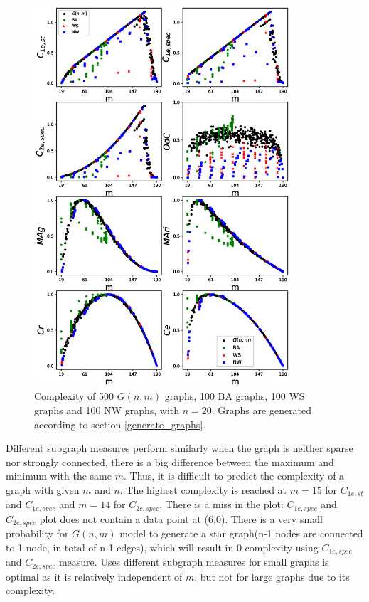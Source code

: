 \documentclass[12pt]{article}
\begin{document}
\noindent
\newpage
\begin{figure}[p!]
    \centering
    \vspace*{-2in}
    \includegraphics[width = 0.85\textwidth]{complexities_sp.eps}
    \vspace*{-0.8in}
    \caption{Complexity of 500 $G(n,m)$ graphs, 100 BA graphs, 100 WS graphs and 100 NW graphs, with $n=20$. Graphs are generated according to section \ref{generate_graphs}.}
    \label{fig:graph_models}
\end{figure}

Different subgraph measures perform similarly when the graph is neither sparse nor strongly connected, there is a big difference between the maximum and minimum with the same $m$. Thus, it is difficult to predict the complexity of a graph with given $m$ and $n$. The highest complexity is reached at $m=15$ for $C_{1e,st}$ and $C_{1e,spec}$ and $m=14$ for $C_{2e,spec}$. There is a miss in the plot: $C_{1e,spec}$ and $C_{2e,spec}$ plot does not contain a data point at (6,0). There is a very small probability for $G(n,m)$ model to generate a star graph(n-1 nodes are connected to 1 node, in total of n-1 edges), which will result in 0 complexity using $C_{1e,spec}$ and $C_{2e,spec}$ measure. Uses different subgraph measures for small graphs is optimal as it is relatively independent of $m$, but not for large graphs due to its complexity.\par
\end{document}
